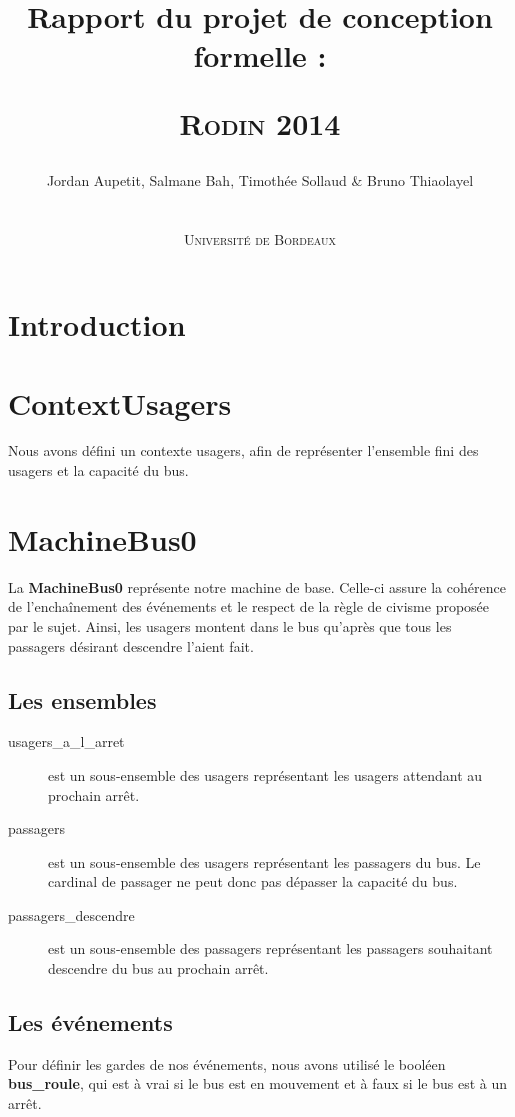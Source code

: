 ﻿\documentclass[a4paper,titlepage]{report}
\title{Rapport du projet de conception formelle :
	\begin{center}
		\textsc{Rodin 2014}
	\end{center}
}
\author{Jordan Aupetit, Salmane Bah, Timothée Sollaud \& Bruno Thiaolayel\\
	\\
	\\ \textsc{Université de Bordeaux}
}
\begin{document}
	\maketitle
	\tableofcontents
	\newpage
	\thispagestyle{empty}	
	\newpage
\markboth{}{}
\section{Introduction}
	

\section{ContextUsagers}
	Nous avons défini un contexte usagers, afin de représenter l'ensemble fini des usagers et la capacité du bus.\\

\section{MachineBus0}
	La \textbf{MachineBus0} représente notre machine de base. Celle-ci assure la cohérence de l'enchaînement des événements et le respect de la règle de civisme proposée par le sujet. Ainsi, les usagers montent dans le bus qu'après que tous les passagers désirant descendre l'aient fait.\\
	
	\subsection{Les ensembles}
		\begin{description}
			\item[usagers\_a\_l\_arret] est un sous-ensemble des usagers représentant les usagers attendant au prochain arrêt.\\
			\item[passagers] est un sous-ensemble des usagers représentant les passagers du bus. Le cardinal de passager ne peut donc pas dépasser la capacité du bus.\\
			\item[passagers\_descendre] est un sous-ensemble des passagers représentant les passagers souhaitant descendre du bus au prochain arrêt.\\
		\end{description}
		
	\subsection{Les événements}
		Pour définir les gardes de nos événements, nous avons utilisé le booléen \textbf{bus\_roule}, qui est à vrai si le bus est en mouvement et à faux si le bus est à un arrêt.\\
		
\end{document}

